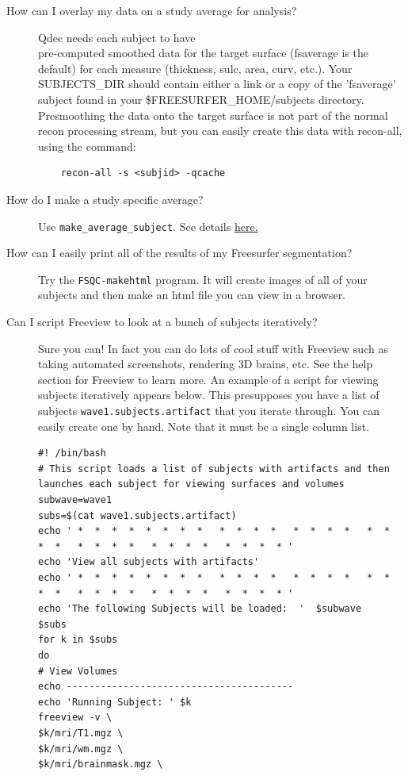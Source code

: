 \documentclass[paper=a4, fontsize=11pt]{scrartcl} %
\numberwithin{equation}{section} %
\numberwithin{figure}{section} %
\numberwithin{table}{section} %
\begin{document}
\begin{appendices}
\begin{description}
\item[How can I overlay my data on a study average for analysis?] Qdec needs each subject to have \\ pre-computed smoothed data for the target surface (fsaverage is the default) for each measure (thickness, sulc, area, curv, etc.). Your SUBJECTS\_DIR should contain either a link or a copy of the 'fsaverage' subject found in your \$FREESURFER\_HOME/subjects directory. Presmoothing the data onto the target surface is not part of the normal recon processing stream, but you can easily create this data with recon-all, using the command: 
	\begin{lstlisting}
	recon-all -s <subjid> -qcache
	\end{lstlisting}
\item[How do I make a study specific average?]  Use \texttt{make\_average\_subject}.  See details  \href{http://surfer.nmr.mgh.harvard.edu/fswiki/make_average_subject}{here.}
\item[How can I easily print all of the results of my Freesurfer segmentation?]  Try the \texttt{FSQC-makehtml} program.  It will create images of all of your subjects and then make an html file you can view in a browser.
\newpage
\item[Can I script Freeview to look at a bunch of subjects iteratively?]  Sure you can!  In fact you can do lots of cool stuff with Freeview such as taking automated screenshots, rendering 3D brains, etc.  See the help section for Freeview to learn more.  An example of a script for viewing subjects iteratively appears below.  This presupposes you have a list of subjects \texttt{wave1.subjects.artifact} that you iterate through.  You can easily create one by hand.  Note that it must be a single column list.
\begin{lstlisting}
#! /bin/bash
# This script loads a list of subjects with artifacts and then launches each subject for viewing surfaces and volumes
subwave=wave1
subs=$(cat wave1.subjects.artifact)
echo ' *  *  *  *  *  *  *  *   *  *  *  *   *  *  *  *   *  *  *  *   *  *  *  *   *  *  *  *   *  *  *  * '
echo 'View all subjects with artifacts'
echo ' *  *  *  *  *  *  *  *   *  *  *  *   *  *  *  *   *  *  *  *   *  *  *  *   *  *  *  *   *  *  *  * '
echo 'The following Subjects will be loaded:  '  $subwave
$subs
for k in $subs
do
# View Volumes
echo ----------------------------------------
echo 'Running Subject: ' $k
freeview -v \
$k/mri/T1.mgz \
$k/mri/wm.mgz \
$k/mri/brainmask.mgz \

\end{lstlisting}
\end{description}
\end{appendices}
\end{document}
